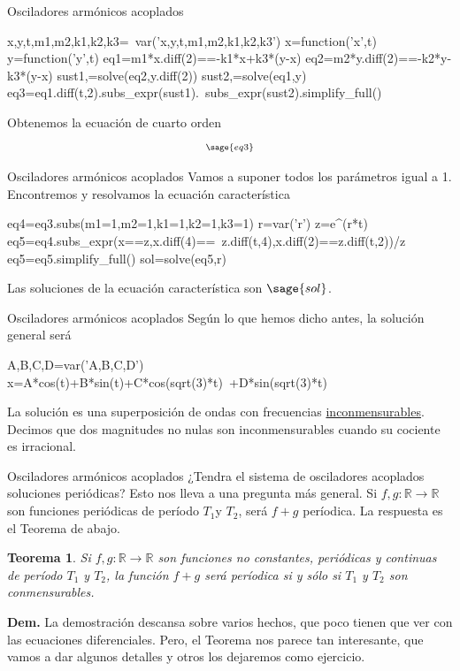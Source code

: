 \documentclass[handout,hyperref={colorlinks=true}]{beamer}
\newtheorem{thm}{Teorema}
\newcommand{\rr}{\mathbb{R}}
\begin{document}
\begin{frame}[fragile]{Osciladores armónicos acoplados}
\begin{sageblock}
  x,y,t,m1,m2,k1,k2,k3=\
  var('x,y,t,m1,m2,k1,k2,k3')
  x=function('x',t)
  y=function('y',t)
  eq1=m1*x.diff(2)==-k1*x+k3*(y-x)
  eq2=m2*y.diff(2)==-k2*y-k3*(y-x)
  sust1,=solve(eq2,y.diff(2))
  sust2,=solve(eq1,y)
  eq3=eq1.diff(t,2).subs_expr(sust1).\
  subs_expr(sust2).simplify_full()
\end{sageblock}
Obtenemos la ecuación de cuarto orden
\[{\scriptstyle \sage{eq3}}\]
\end{frame}


\begin{frame}[fragile]{Osciladores armónicos acoplados}
 Vamos a suponer todos los parámetros igual a 1. Encontremos y resolvamos la ecuación característica
\begin{sageblock}
  eq4=eq3.subs(m1=1,m2=1,k1=1,k2=1,k3=1)
  r=var('r')
  z=e^(r*t)
  eq5=eq4.subs_expr(x==z,x.diff(4)==\
  z.diff(t,4),x.diff(2)==z.diff(t,2))/z
  eq5=eq5.simplify_full()
  sol=solve(eq5,r)
\end{sageblock}
Las soluciones de la ecuación característica son $\sage{sol}$.
\end{frame}



\begin{frame}[fragile]{Osciladores armónicos acoplados}
Según lo que hemos dicho antes, la solución general será
\begin{sageblock}
  A,B,C,D=var('A,B,C,D')
  x=A*cos(t)+B*sin(t)+C*cos(sqrt(3)*t)\
  +D*sin(sqrt(3)*t)
\end{sageblock}
La solución es una superposición de ondas con frecuencias \href{http://es.wikipedia.org/wiki/Conmensurabilidad_(matemática)}{inconmensurables}. Decimos que dos magnitudes no nulas son inconmensurables cuando su cociente es irracional. 



\end{frame}


\begin{frame}{Osciladores armónicos acoplados}
¿Tendra el sistema de osciladores acoplados soluciones periódicas?  Esto nos lleva a una pregunta más general. Si $f,g:\rr\to\rr$ son funciones periódicas de período $T_1$y $T_2$, será $f+g$ períodica. La respuesta es el Teorema de abajo. 
  
\begin{thm}  Si $f,g:\rr\to\rr$ son funciones no constantes, periódicas y continuas de período $T_1$ y $T_2$, la función $f+g$ será períodica si y sólo si $T_1$ y $T_2$ son conmensurables.
\end{thm}

\textbf{Dem.} La demostración descansa sobre varios hechos, que poco tienen que ver con las ecuaciones diferenciales. Pero, el Teorema nos parece tan interesante, que vamos a dar algunos detalles y otros los dejaremos como ejercicio.



\end{frame}
\end{document}
